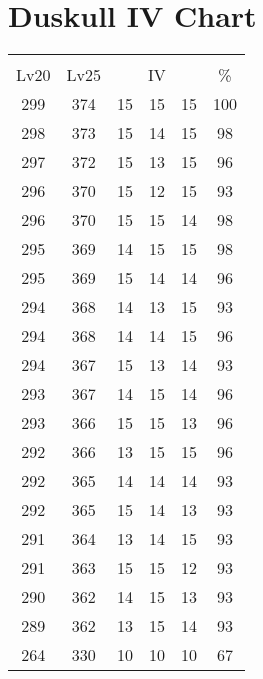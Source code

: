 \documentclass{article}%
\begin{document}
%
\normalsize%
\section{Duskull IV Chart}%
\label{sec:Duskull IV Chart}%
\renewcommand{\arraystretch}{1.5}%
\begin{tabular}{|c|c|c|c|c|c|}%
\hline%
\multicolumn{6}{|c|}{\textcolor{white}{ 
\linebreak{Duskull}
}%
\cellcolor{black}}\\%
\multicolumn{1}{|c}{Lv20}&\multicolumn{1}{c|}{Lv25}&\multicolumn{3}{c|}{IV}&\multicolumn{1}{|c|}{\%}\\%
\hline%
\rowcolor{color100}%
299&374&15&15&15&100\\%
\hline%
\rowcolor{color98}%
298&373&15&14&15&98\\%
\hline%
\rowcolor{color96}%
297&372&15&13&15&96\\%
\hline%
\rowcolor{color93}%
296&370&15&12&15&93\\%
\hline%
\rowcolor{color98}%
296&370&15&15&14&98\\%
\hline%
\rowcolor{color98}%
295&369&14&15&15&98\\%
\hline%
\rowcolor{color96}%
295&369&15&14&14&96\\%
\hline%
\rowcolor{color93}%
294&368&14&13&15&93\\%
\hline%
\rowcolor{color96}%
294&368&14&14&15&96\\%
\hline%
\rowcolor{color93}%
294&367&15&13&14&93\\%
\hline%
\rowcolor{color96}%
293&367&14&15&14&96\\%
\hline%
\rowcolor{color96}%
293&366&15&15&13&96\\%
\hline%
\rowcolor{color96}%
292&366&13&15&15&96\\%
\hline%
\rowcolor{color93}%
292&365&14&14&14&93\\%
\hline%
\rowcolor{color93}%
292&365&15&14&13&93\\%
\hline%
\rowcolor{color93}%
291&364&13&14&15&93\\%
\hline%
\rowcolor{color93}%
291&363&15&15&12&93\\%
\hline%
\rowcolor{color93}%
290&362&14&15&13&93\\%
\hline%
\rowcolor{color93}%
289&362&13&15&14&93\\%
\hline%
\rowcolor{color91}%
264&330&10&10&10&67\\%
\end{tabular}

%
\end{document}
